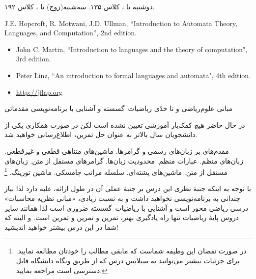 \documentclass[10pt,a5paper,computeautoilg,pdfinfo=on]{unistyle}
\begin{document}

\ptext[1]

‌دوشنبه \clock[13:30] تا \clock[15:00]، کلاس ۱۳۵. سه‌شنبه(زوج) \clock[13:30] تا \clock[15]، کلاس ۱۹۲.
 
\begin{latin}
J.E. Hopcroft, R. Motwani, J.D. Ullman, ‍‍‍‍``\textsf{Introduction to Automata Theory, Languages, and Computation}'', 2nd edition‬‬.\footnotemark
\end{latin}


\begin{latin}
\begin{itemize}
	\item John C. Martin, ``\textsf{Introduction to languages and the theory of computation}", 3rd edition.
	\item Peter Linz, ``\textsf{An introduction to formal languages and automata}", 4th edition.
	\item \url{http://jflap.org}	
\end{itemize}
\end{latin}

مبانی ‌علوم‌ریاضی و تا حدّی ریاضیات~گسسته و آشنایی با برنامه‌نویسی مقدماتی

در حال حاضر هیچ کمک‌یار آموزشی تعیین نشده است لکن در صورت همکاری یکی از دانشجویان سال بالاتر به عنوان حل تمرین،
اطلاع‌رسانی خواهید شد. 

‫مقدم‌های بر زبان‌های رسمی و گرامرها. ماشین‌های متناهی قطعی و غیرقطعی. زبان‌های منظم. عبارات منظم. محدودیت زبان‌ها. 
گرامرهای مستقل‬ ‫از متن. زبان‌های مستقل از متن. ماشین‌های پشته‌ای. سلسله مراتب چامسکی. ماشین تورینگ.‬%
\footnote{در صورت نقصان این وظیفه شماست که مابقی مطالب را خودتان مطالعه نمایید. برای جزئیات بیشتر می‌توانید به سیلابس درس که از طریق وبگاه دانشگاه قابل دسترسی است مراجعه نمایید.}
  
  
با توجه به اینکه جنبهٔ نظری این درس بر جنبهٔ عملی آن در طول ارائه، غلبه دارد لذا نیاز چندانی به برنامه‌نویسی نخواهید داشت و
 به نسبت زیادی، «مبانی نظریه محاسبات» درسی ریاضی محور است و آشنایی با ریاضیات~گسسته ضروری است 
لذا همانند سایر دروس پایهٔ ریاضیات تنها راه یادگیری بهتر، تمرین و تمرین و تمرین است. 
و البته که شما در این درس بیشتر خواهید اندیشید!
\end{document}
